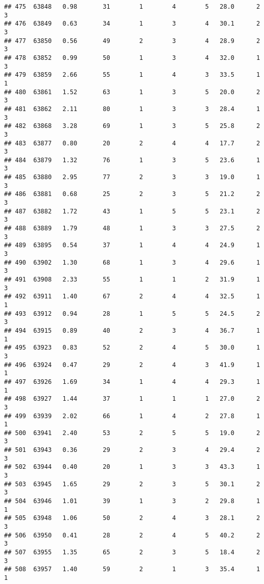 \documentclass[
]{article}
\begin{document}
\begin{verbatim}
## 475  63848   0.98       31        1        4        5   28.0      2      3
## 476  63849   0.63       34        1        3        4   30.1      2      3
## 477  63850   0.56       49        2        3        4   28.9      2      3
## 478  63852   0.99       50        1        3        4   32.0      1      3
## 479  63859   2.66       55        1        4        3   33.5      1      1
## 480  63861   1.52       63        1        3        5   20.0      2      3
## 481  63862   2.11       80        1        3        3   28.4      1      3
## 482  63868   3.28       69        1        3        5   25.8      2      3
## 483  63877   0.80       20        2        4        4   17.7      2      3
## 484  63879   1.32       76        1        3        5   23.6      1      3
## 485  63880   2.95       77        2        3        3   19.0      1      3
## 486  63881   0.68       25        2        3        5   21.2      2      3
## 487  63882   1.72       43        1        5        5   23.1      2      3
## 488  63889   1.79       48        1        3        3   27.5      2      3
## 489  63895   0.54       37        1        4        4   24.9      1      3
## 490  63902   1.30       68        1        3        4   29.6      1      3
## 491  63908   2.33       55        1        1        2   31.9      1      3
## 492  63911   1.40       67        2        4        4   32.5      1      1
## 493  63912   0.94       28        1        5        5   24.5      2      3
## 494  63915   0.89       40        2        3        4   36.7      1      1
## 495  63923   0.83       52        2        4        5   30.0      1      3
## 496  63924   0.47       29        2        4        3   41.9      1      1
## 497  63926   1.69       34        1        4        4   29.3      1      1
## 498  63927   1.44       37        1        1        1   27.0      2      3
## 499  63939   2.02       66        1        4        2   27.8      1      1
## 500  63941   2.40       53        2        5        5   19.0      2      3
## 501  63943   0.36       29        2        3        4   29.4      2      3
## 502  63944   0.40       20        1        3        3   43.3      1      3
## 503  63945   1.65       29        2        3        5   30.1      2      3
## 504  63946   1.01       39        1        3        2   29.8      1      1
## 505  63948   1.06       50        2        4        3   28.1      2      3
## 506  63950   0.41       28        2        4        5   40.2      2      3
## 507  63955   1.35       65        2        3        5   18.4      2      3
## 508  63957   1.40       59        2        1        3   35.4      1      1

\end{verbatim}
\end{document}
